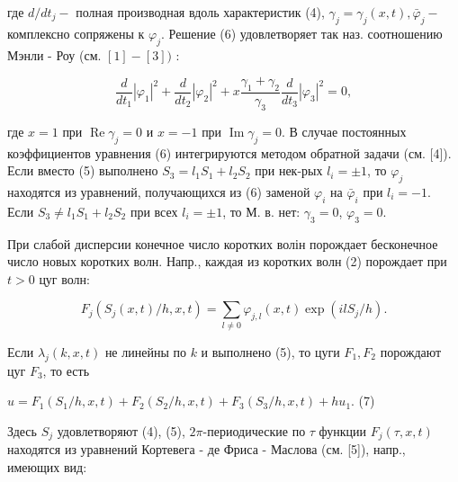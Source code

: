 \documentclass[10pt]{article}
\begin{document}
где $d / d t_{j}-$ полная производная вдоль характеристик (4), $\gamma_{j}=\gamma_{j}(x, t), \bar{\varphi}_{j}-$ комплексно сопряжены к $\varphi_{j}$. Решение (6) удовлетворяет так наз. соотношению Мэнли - Роу (см. $[1]-[3])$ :



\[

\frac{d}{d t_{1}}\left|\varphi_{1}\right|^{2}+\frac{d}{d t_{2}}\left|\varphi_{2}\right|^{2}+x \frac{\gamma_{1}+\gamma_{2}}{\gamma_{3}} \frac{d}{d t_{3}}\left|\varphi_{3}\right|^{2}=0,

\]



где $x=1$ при $\operatorname{Re} \gamma_{j}=0$ и $x=-1$ при $\operatorname{Im} \gamma_{j}=0$. В случае постоянных коэффициентов уравнения (6) интегрируются методом обратной задачи (см. [4]). Если вместо (5) выполнено $S_{3}=l_{1} S_{1}+l_{2} S_{2}$ при нек-рых $l_{i}= \pm 1$, то $\varphi_{j}$ находятся из уравнений, получающихся из (6) заменой $\varphi_{i}$ на $\bar{\varphi}_{i}$ при $l_{i}=-1$. Если $S_{3} \neq l_{1} S_{1}+l_{2} S_{2}$ при всех $l_{i}= \pm 1$, то М. в. нет: $\gamma_{3}=0$, $\varphi_{3}=0$.



При слабой дисперсии конечное число коротких волін порождает бесконечное число новых коротких волн. Напр., каждая из коротких волн (2) порождает при $t>0$ цуг волн:



\[

F_{j}\left(S_{j}(x, t) / h, x, t\right)=\sum_{l \neq 0} \varphi_{j, l}(x, t) \exp \left(i l S_{j} / h\right) .

\]



Если $\lambda_{j}(k, x, t)$ не линейны по $k$ и выполнено (5), то цуги $F_{1}, F_{2}$ порождают цуг $F_{3}$, то есть



$u=F_{1}\left(S_{1} / h, x, t\right)+F_{2}\left(S_{2} / h, x, t\right)+F_{3}\left(S_{3} / h, x, t\right)+h u_{1}$. (7)



Здесь $S_{j}$ удовлетворяют (4), (5), $2 \pi$-периодические по $\tau$ функции $F_{j}(\tau, x, t)$ находятся из уравнений Кортевега - де Фриса - Маслова (см. [5]), напр., имеющих вид:
\end{document}
